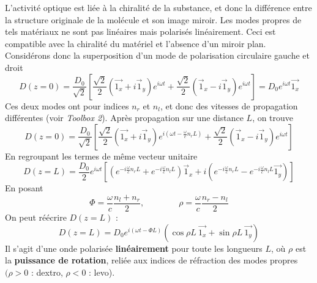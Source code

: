 L'activité optique est liée à la chiralité de la substance, et donc la différence entre la 
structure originale de la molécule et son image miroir. Les modes propres de tels matériaux ne
sont pas linéaires mais polarisés linéairement. Ceci est compatible avec la chiralité du 
matériel et l'absence d'un miroir plan. Considérons donc la superposition d'un mode de polarisation
circulaire gauche et droit
\begin{equation}
D(z=0) = \dfrac{D_0}{\sqrt{2}}\left[\dfrac{\sqrt{2}}{2}(\vec{1_x}+i\vec 1_y)e^{i\omega t} + 
\dfrac{\sqrt{2}}{2}(\vec 1_x-i \vec 1_y)e^{i\omega t}\right] = D_0e^{i\omega t}\vec{1_x}
\end{equation}
Ces deux modes ont pour indices $n_r$ et $n_l$, et donc des vitesses de propagation différentes (voir \textit{Toolbox 2}). 
Après propagation sur une distance $L$, on trouve
\begin{equation}
D(z=0) = \dfrac{D_0}{\sqrt{2}}\left[\dfrac{\sqrt{2}}{2}(\vec{1_x}+i\vec 1_y)e^{i\left(\omega t
-\frac{\omega}{c}n_rL\right)} + 
\dfrac{\sqrt{2}}{2}(\vec 1_x-i \vec 1_y)e^{i\omega t}\right]
\end{equation}
En regroupant les termes de même vecteur unitaire
\begin{equation}
D(z=L) = \dfrac{D_0}{2}e^{i\omega t}\left[\left(e^{-i\frac{\omega}{c}n_rL}+e^{-i\frac{\omega}{c}n_lL}
\right)\vec{1}_x+i\left(e^{-i\frac{\omega}{c}n_rL}-e^{-i\frac{\omega}{c}n_lL}\vec{1_y}\right)\right]
\end{equation}
En posant
\begin{equation}
\Phi = \frac{\omega}{c} \frac{n_l+n_r}{2},\qquad\qquad \rho = \frac{\omega}{c}\frac{n_r-n_l}{2}
\end{equation}
On peut réécrire $D(z=L)$ :
\begin{equation}
D(z=L) = D_0e^{i(\omega t-\Phi L)}\left(\cos\rho L\ \vec{1_x}+\sin\rho L\ \vec{1_y}\right)
\end{equation}
Il s'agit d'une onde polarisée \textbf{linéairement} pour toute les longueurs $L$, où $\rho$ est la 
\textbf{puissance de rotation}, reliée aux indices de réfraction des modes propres $(\rho>0$ : dextro, 
$\rho<0$ : levo). \\

